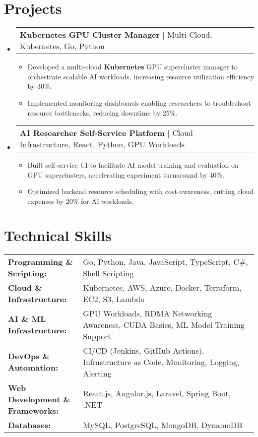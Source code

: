 \documentclass[letterpaper,11pt]{article}
\makeatletter
\newcommand{\resumeItem}[1]{
  \item\footnotesize{
    {#1 \vspace{-2pt}}
  }
}
\newcommand{\resumeProjectHeading}[2]{
    \item
    \begin{tabular*}{1.001\textwidth}{l@{\extracolsep{\fill}}r}
      \small#1 & \textbf{\small #2}\\
    \end{tabular*}\vspace{-7pt}
}
\newcommand{\resumeSubHeadingListStart}{\begin{itemize}[leftmargin=0pt, label={}]}
\newcommand{\resumeSubHeadingListEnd}{\end{itemize}}
\newcommand{\resumeItemListStart}{\begin{itemize}[leftmargin=*]}
\newcommand{\resumeItemListEnd}{\end{itemize}\vspace{-5pt}}
\makeatother
\begin{document}
\section{Projects}
    \vspace{-5pt}
    \resumeSubHeadingListStart
      \resumeProjectHeading
          {\textbf{Kubernetes GPU Cluster Manager} $|$ Multi-Cloud, Kubernetes, Go, Python}{}
          \resumeItemListStart
              \resumeItem{Developed a multi-cloud \textbf{Kubernetes} GPU supercluster manager to orchestrate scalable AI workloads, increasing resource utilization efficiency by 30\%.}
              \resumeItem{Implemented monitoring dashboards enabling researchers to troubleshoot resource bottlenecks, reducing downtime by 25\%.}
          \resumeItemListEnd
          \vspace{-16pt}
      \resumeProjectHeading
          {\textbf{AI Researcher Self-Service Platform} $|$ Cloud Infrastructure, React, Python, GPU Workloads}{}
          \resumeItemListStart
              \resumeItem{Built self-service UI to facilitate AI model training and evaluation on GPU superclusters, accelerating experiment turnaround by 40\%.}
              \resumeItem{Optimized backend resource scheduling with cost-awareness, cutting cloud expenses by 20\% for AI workloads.}
          \resumeItemListEnd
          \vspace{-16pt}
    \resumeSubHeadingListEnd
\vspace{-10pt}
\section{Technical Skills}
        \vspace{-14pt}
        \begin{table}[h]
            \footnotesize
            \begin{tabular}{p{0.3\linewidth} p{0.7\linewidth}}
                \textbf{Programming \& Scripting:} & Go, Python, Java, JavaScript, TypeScript, C\#, Shell Scripting \\
                \textbf{Cloud \& Infrastructure:} & Kubernetes, AWS, Azure, Docker, Terraform, EC2, S3, Lambda \\
                \textbf{AI \& ML Infrastructure:} & GPU Workloads, RDMA Networking Awareness, CUDA Basics, ML Model Training Support \\
                \textbf{DevOps \& Automation:} & CI/CD (Jenkins, GitHub Actions), Infrastructure as Code, Monitoring, Logging, Alerting \\
                \textbf{Web Development \& Frameworks:} & React.js, Angular.js, Laravel, Spring Boot, .NET \\
                \textbf{Databases:} & MySQL, PostgreSQL, MongoDB, DynamoDB \\
            \end{tabular}
        \end{table}
\end{document}
